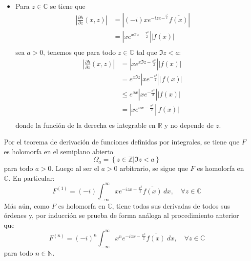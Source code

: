 \documentclass[12pt]{report}
\newcounter{it}
\theoremstyle{largebreak}
\renewcommand{\leq}{\ensuremath{\leqslant}}
\newcommand\abs[1]{\ensuremath{\left|#1\right|}}
\newcommand\conj[1]{\ensuremath{\overline{#1}}}
\begin{document}
\begin{sol}
\begin{itemize}
            \item Para $z\in\mathbb{C}$ se tiene que
            \begin{equation*}
                \begin{split}
                    \abs{\frac{\partial h}{\partial z}(x,z)}&=\abs{(-i)xe^{-izx-^{\frac{x^2}{2}}}\conj{f(x)}}\\
                    &=\abs{xe^{x\Im z-\frac{x^2}{2}}}\abs{f(x)}\\
                \end{split}
            \end{equation*}
            sea $a>0$, tenemos que para todo $z\in\mathbb{C}$ tal que $\Im z<a$:
            \begin{equation*}
                \begin{split}
                    \abs{\frac{\partial h}{\partial z}(x,z)}&=\abs{xe^{x\Im z-\frac{x^2}{2}}}\abs{f(x)}\\
                    &=e^{x\Im z} \abs{xe^{-\frac{x^2}{2}}}\abs{f(x)}\\
                    &\leq e^{ ax}\abs{xe^{-\frac{x^2}{2}}}\abs{f(x)}\\
                    &=\abs{xe^{ax-\frac{x^2}{2}}}\abs{f(x)}\\
                \end{split}
            \end{equation*}
            donde la función de la derecha es integrable en $\mathbb{R}$ y no depende de $z$.
        \end{itemize}
        Por el teorema de derivación de funciones definidas por integrales, se tiene que $F$ es holomorfa en el semiplano abierto
        \begin{equation*}
            \Omega_a=\left\{z\in\mathbb{Z}\Big|\Im z<a \right\}
        \end{equation*}
        para todo $a>0$. Luego al ser el $a>0$ arbitrario, se sigue que $F$ es homolorfa en $\mathbb{C}$. En particular:
        \begin{equation*}
            F^{(1)}=(-i)\int_{-\infty}^\infty xe^{ -izx-\frac{x^2}{2}}\conj{f(x)}\:dx,\quad\forall z\in\mathbb{C}
        \end{equation*}
        Más aún, como $F$ es holomorfa en $\mathbb{C}$, tiene todas sus derivadas de todos sus órdenes y, por inducción se prueba de forma análoga al procedimiento anterior que
        \begin{equation*}
            F^{(n)}=(-i)^n\int_{-\infty}^\infty x^ne^{ -izx-\frac{x^2}{2}}\conj{f(x)}\:dx,\quad\forall z\in\mathbb{C}
        \end{equation*}
        para todo $n\in\mathbb{N}$.


\end{sol}
\end{document}
